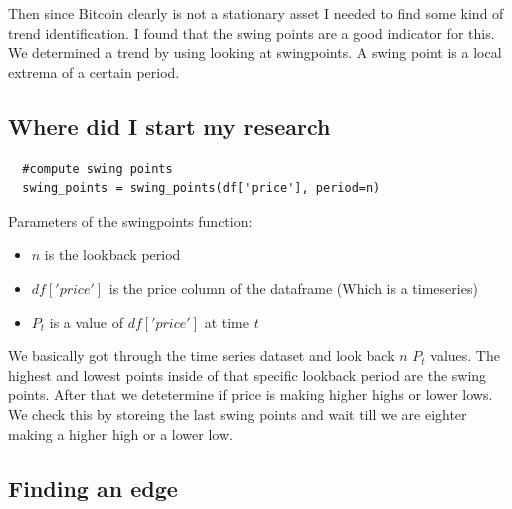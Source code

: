 \documentclass[12pt]{article}
\begin{document}
Then since Bitcoin clearly is not a stationary asset I needed to find some kind of trend identification. I found that the swing points are a good indicator for this.
We determined a trend by using looking at swingpoints. A swing point is a local extrema of a certain period.

\subsection{Where did I start my research}
\begin{verbatim}
  #compute swing points
  swing_points = swing_points(df['price'], period=n)

\end{verbatim}

Parameters of the swing\textunderscore points function:
\begin{itemize}
  \item $n$ is the lookback period
  \item $df['price']$ is the price column of the dataframe (Which is a timeseries)
  \item $P_t$ is a value of $df['price']$ at time $t$
\end{itemize}


We basically got through the time series dataset and look back $n$ $P_t$ values. The highest and lowest points inside of that specific lookback period are the swing points. After that we detetermine if price is making higher highs or lower lows. We check this by storeing the last swing points and wait till we are eighter making a higher high or a lower low.



\subsection{Finding an edge}
\end{document}
